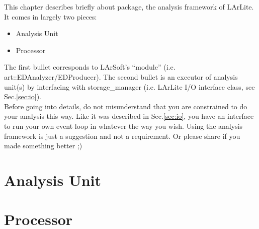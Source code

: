 
This chapter describes briefly about \Analysis package, the analysis framework of LArLite.
It comes in largely two pieces:
\begin{itemize}
\item Analysis Unit
\item Processor
\end{itemize}
The first bullet corresponds to LArSoft's ``module'' (i.e. {\ttfamily art::EDAnalyzer/EDProducer}).
The second bullet is an executor of analysis unit(s) by interfacing with {\ttfamily storage\_manager} (i.e. LArLite I/O interface class, see Sec.\ref{sec:io}). \\

Before going into details, do not misunderstand that you are constrained to do your analysis this way.
Like it was described in Sec.\ref{sec:io}, you have an interface to run your own event loop in whatever the way you wish.
Using the analysis framework is just a suggestion and not a requirement.
Or please share if you made something better ;)

\section{Analysis Unit}
\label{sec:ana_base}


\section{Processor}
\label{sec:ana_processor}

